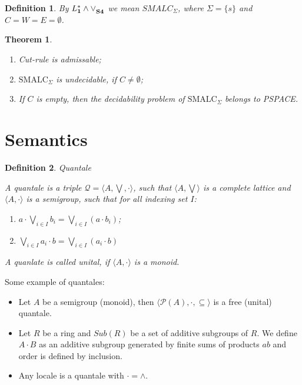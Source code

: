 \documentclass[a4paper]{article}
\theoremstyle{defin}
\newtheorem{defin}{Definition}
\theoremstyle{theorem}
\newtheorem{theorem}{Theorem}
\theoremstyle{prop}
\theoremstyle{lemma}
\theoremstyle{ex}
\theoremstyle{col}
\begin{document}
\begin{defin}
  By ${L^{*}_{\bf 1} \land \lor}_{\bf S4}$ we mean $SMALC_{\Sigma}$, where $\Sigma = \{ s \}$ and $C = W = E = \emptyset$.
\end{defin}


\begin{theorem}
$ $

  \begin{enumerate}
    \item Cut-rule is admissable;
    \item $\text{SMALC}_{\Sigma}$ is undecidable, if $C \neq \emptyset$;
    \item If $C$ is empty, then the decidability problem of $\text{SMALC}_{\Sigma}$ belongs to PSPACE.
  \end{enumerate}
\end{theorem}

\section{Semantics}

\begin{defin} Quantale
$ $

  A quantale is a triple $\mathcal{Q} = \langle A, \bigvee, \cdot \rangle$, such that $\langle A, \bigvee \rangle$
is a complete lattice and $\langle A, \cdot \rangle$ is a semigroup, such that for all indexing set $I$:

\begin{enumerate}
  \item $a \cdot \bigvee \limits_{i \in I} b_i = \bigvee \limits_{i \in I} (a \cdot b_i)$;
  \item $\bigvee \limits_{i \in I} a_i \cdot b = \bigvee \limits_{i \in I} (a_i \cdot b)$
\end{enumerate}

A quanlate is called unital, if $\langle A, \cdot \rangle$ is a monoid.
\end{defin}

Some example of quantales:

\begin{itemize}
\item Let $A$ be a semigroup (monoid), then $\langle \mathcal{P}(A), \cdot, \subseteq \rangle$
is a free (unital) quantale.
\item Let $R$ be a ring and $Sub(R)$ be a set of additive subgroups of $R$.
We define $A \cdot B$ as an additive subgroup generated by finite sums of products $ab$ and order is defined by inclusion.
\item Any locale is a quantale with $\cdot = \wedge$.
\end{itemize}
\end{document}
